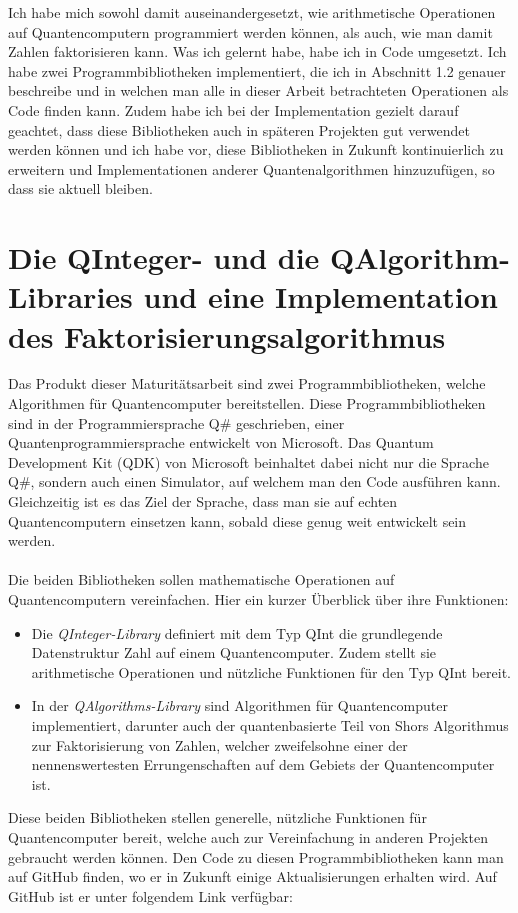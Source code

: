 Ich habe mich sowohl damit auseinandergesetzt, wie arithmetische Operationen auf Quantencomputern programmiert werden können, als auch, wie man damit Zahlen faktorisieren kann. Was ich gelernt habe, habe ich in Code umgesetzt. Ich habe zwei Programmbibliotheken implementiert, die ich in Abschnitt 1.2 genauer beschreibe und in welchen man alle in dieser Arbeit betrachteten Operationen als Code finden kann.  Zudem habe ich bei der Implementation gezielt darauf geachtet, dass diese Bibliotheken auch in späteren Projekten gut verwendet werden können und ich habe vor, diese Bibliotheken in Zukunft kontinuierlich zu erweitern und Implementationen anderer Quantenalgorithmen hinzuzufügen, so dass sie aktuell bleiben. 

\section{Die QInteger- und die QAlgorithm-Libraries und eine Implementation des Faktorisierungsalgorithmus}
Das Produkt dieser Maturitätsarbeit sind zwei Programmbibliotheken, welche Algorithmen für Quantencomputer bereitstellen. Diese Programmbibliotheken sind in der Programmiersprache Q\# geschrieben, einer Quantenprogrammiersprache entwickelt von Microsoft. Das Quantum Development Kit (QDK) von Microsoft beinhaltet dabei nicht nur die Sprache Q\#, sondern auch einen Simulator, auf welchem man den Code ausführen kann. Gleichzeitig ist es das Ziel der Sprache, dass man sie auf echten Quantencomputern einsetzen kann, sobald diese genug weit entwickelt sein werden.
\paragraph{}
Die beiden Bibliotheken sollen mathematische Operationen auf Quantencomputern vereinfachen. Hier ein kurzer Überblick über ihre Funktionen: %
\begin{itemize}
  \item Die \textit{QInteger-Library} definiert mit dem Typ \grqq QInt\grqq{} die grundlegende Datenstruktur \grqq Zahl\grqq{} auf einem Quantencomputer. Zudem stellt sie arithmetische Operationen und nützliche Funktionen für den Typ \grqq QInt\grqq{} bereit. %
  \item In der \textit{QAlgorithms-Library} sind Algorithmen für Quantencomputer implementiert, darunter auch der quantenbasierte Teil von Shors Algorithmus zur Faktorisierung von Zahlen, welcher zweifelsohne einer der nennenswertesten Errungenschaften auf dem Gebiets der Quantencomputer ist.
\end{itemize}
Diese beiden Bibliotheken stellen generelle, nützliche Funktionen für Quantencomputer bereit, welche auch zur Vereinfachung in anderen Projekten gebraucht werden können. Den Code zu diesen Programmbibliotheken kann man auf GitHub finden, wo er in Zukunft einige Aktualisierungen erhalten wird. Auf GitHub ist er unter folgendem Link verfügbar:
